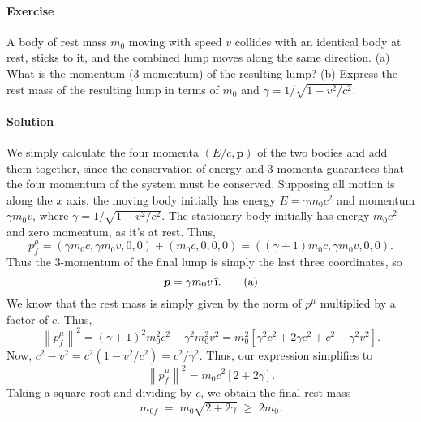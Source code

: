\documentclass[10pt]{article}
\let\vec\boldsymbol
\newcommand{\uveci}{{\bm{\hat{\textnormal{\bfseries\i}}}}}
\newcommand\norm[1]{\left\lVert#1\right\rVert}
\newcounter{prob}
\def\problem{\stepcounter{prob}\paragraph{Exercise \arabic{prob}}}
\def\solution{\paragraph{Solution}}
\begin{document}
        \problem A body of rest mass $m_0$ moving with speed $v$ collides with an identical body at rest, sticks to it, and the combined lump
        moves along the same direction. 
        (a) What is the momentum (3-momentum) of the resulting lump? 
        (b) Express the rest mass of the resulting lump in terms of $m_0$ and $\gamma = 1 /\sqrt{1 - v^2 /c^2}$.

        \solution We simply calculate the four momenta $(E /c, \vec{p})$ of the two bodies and add them together, since the conservation 
        of energy and 3-momenta guarantees that the four momentum of the system must be conserved.
        Supposing all motion is along the $x$ axis, the moving body initially has energy $E = \gamma m_0c^2$ and momentum $\gamma m_0 v$,
        where $\gamma = 1 /\sqrt{1 - v^2 / c^2}$. The stationary body initially has energy $m_0c^2$ and zero momentum, as it's at rest.
        Thus,
        \[
                p_f^\mu = \left(\gamma m_0c, \gamma m_0v, 0, 0\right) + \left(m_0c, 0, 0, 0\right) = \left((\gamma + 1)m_0c, \gamma m_0v, 0, 0\right).
        \]
        Thus the 3-momentum of the final lump is simply the last three coordinates, so 
        \[
                \vec{p} = \gamma m_0 v \,\uveci. \tag{a}
        \]
        We know that the rest mass is simply given by the norm of $p^\mu$ multiplied by a factor of $c$. Thus,
        \[
                \norm{p_f^\mu}^2 = (\gamma + 1)^2m_0^2c^2 - \gamma^2m_0^2 v^2 = m_0^2\left[\gamma^2c^2 + 2\gamma c^2 + c^2 - \gamma^2v^2\right].
        \]
        Now, $c^2 - v^2 = c^2 (1 - v^2 /c^2) = c^2 /\gamma^2$. Thus, our expression simplifies to
        \[
                \norm{p_f^\mu}^2 = m_0c^2\left[2 + 2\gamma\right] .
        \]
        Taking a square root and dividing by $c$, we obtain the final rest mass
        \[
                m_{0f} \;=\; m_0\sqrt{2 + 2\gamma} \;\geq\; 2m_0. \tag{b}
        \]
\end{document}
